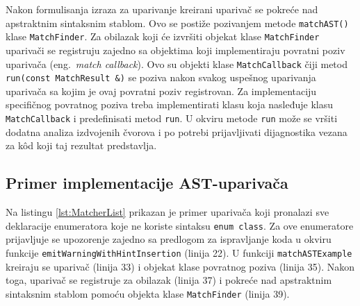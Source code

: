 \documentclass[12pt,oneside]{memoir}
\begin{document}
\par
Nakon formulisanja izraza za uparivanje kreirani upariva\v{c} se pokre\'{c}e nad apstraktnim sintaksnim stablom. Ovo se posti\v{z}e pozivanjem metode \texttt{matchAST()} klase \texttt{MatchFinder}. 
Za obilazak koji \'{c}e izvr\v{s}iti objekat klase \texttt{MatchFinder} upariva\v{c}i se registruju zajedno sa objektima koji implementiraju povratni poziv upariva\v{c}a (eng.~\textit{match callback}). 
Ovo su objekti klase \texttt{MatchCallback} \v{c}iji metod \texttt{run(const MatchResult \&)} se poziva nakon svakog uspe\v{s}nog uparivanja 
upariva\v{c}a sa kojim je ovaj povratni poziv registrovan. Za implementaciju specifi\v{c}nog povratnog poziva treba implementirati klasu koja nasleđuje klasu \texttt{MatchCallback} i predefinisati metod \texttt{run}. U okviru metode \texttt{run} mo\v{z}e se vr\v{s}iti dodatna analiza izdvojenih \v{c}vorova i po potrebi
prijavljivati dijagnostika vezana za k\^{o}d koji taj rezultat predstavlja. 
\subsection{Primer implementacije AST-upariva\v{c}a}
Na listingu \ref{lst:MatcherList} prikazan je primer upariva\v{c}a koji pronalazi sve deklaracije enumeratora koje ne koriste sintaksu \texttt{enum class}. Za ove enumeratore prijavljuje se upozorenje zajedno sa predlogom za ispravljanje koda u okviru funkcije \texttt{emitWarningWithHintInsertion} (linija 22). U funkciji \texttt{matchASTExample} kreiraju se upariva\v{c} (linija 33) i objekat klase povratnog poziva (linija 35). Nakon toga, upariva\v{c} se registruje za obilazak (linija 37) i pokre\'{c}e nad apstraktnim sintaksnim stablom pomo\'{c}u objekta klase \texttt{MatchFinder} (linija 39).
\end{document}
